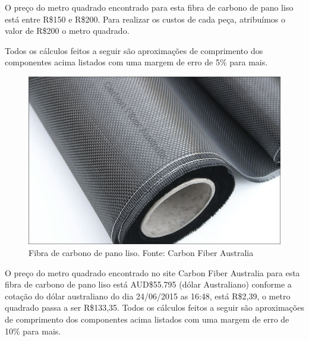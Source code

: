 O preço do metro quadrado encontrado para esta fibra de carbono de pano liso está entre R\$150 e R\$200. Para realizar os custos de cada peça, atribuímos o valor de R\$200 o metro quadrado.

Todos os cálculos feitos a seguir são aproximações de comprimento dos componentes acima listados com uma margem de erro de 5\% para mais.

\begin{figure}[H]
    \centering
      \includegraphics[keepaspectratio=true,scale=0.2]{figuras/fibra_carbono.png}
    \caption{Fibra de carbono de pano liso. Fonte: Carbon Fiber Australia\protect\footnotemark}
    \label{fig:frame_central}
\end{figure}


O preço do metro quadrado encontrado no site Carbon Fiber Australia para esta fibra de carbono 
de pano liso está AUD\$55.795  (dólar Australiano) conforme a cotação do dólar australiano do dia
24/06/2015 as 16:48, está R\$2,39, o metro quadrado passa a ser R\$133,35.
Todos os cálculos feitos a seguir são aproximações de comprimento dos componentes acima listados
com uma margem de erro de 10\% para mais.

